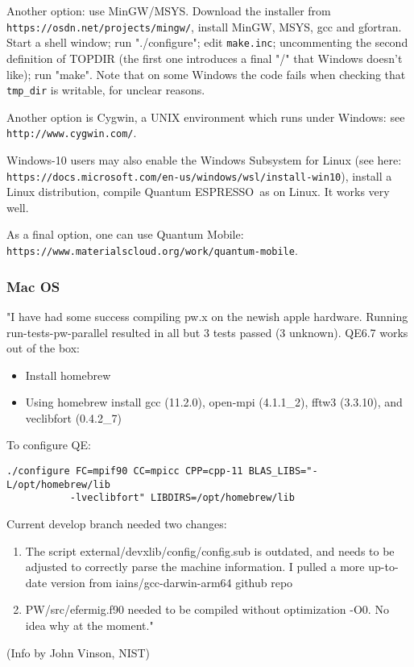 \documentclass[12pt,a4paper]{article}
\def\qe{{\sc Quantum ESPRESSO}}
\begin{document}
Another option: use MinGW/MSYS. Download the installer from
\texttt{https://osdn.net/projects/mingw/}, install MinGW, MSYS, gcc and
gfortran. Start a shell window; run "./configure"; edit \texttt{make.inc};
uncommenting the second definition of TOPDIR (the first one introduces a
final "/" that Windows doesn't like); run "make". Note that on some Windows
the code fails when checking that \texttt{tmp\_dir} is writable, for unclear
reasons.

Another option is Cygwin, a UNIX environment which runs under Windows: see\\
\texttt{http://www.cygwin.com/}.

Windows-10 users may also enable the Windows Subsystem for Linux (see here:\\
\texttt{https://docs.microsoft.com/en-us/windows/wsl/install-win10}),
install a Linux distribution, compile \qe\ as on Linux. It works very well.

As a final option, one can use Quantum Mobile:\\
\texttt{https://www.materialscloud.org/work/quantum-mobile}.

\subsubsection{Mac OS}

"I have had some success compiling pw.x on the newish apple hardware.
Running run-tests-pw-parallel resulted in all but 3 tests passed (3 unknown).
QE6.7 works out of the box:
\begin{itemize}
\item Install homebrew
\item Using homebrew install gcc (11.2.0), open-mpi (4.1.1\_2), 
fftw3 (3.3.10), and veclibfort (0.4.2\_7)
\end{itemize}
To configure QE: 
\begin{verbatim}
./configure FC=mpif90 CC=mpicc CPP=cpp-11 BLAS_LIBS="-L/opt/homebrew/lib
           -lveclibfort" LIBDIRS=/opt/homebrew/lib
\end{verbatim}
Current develop branch needed two changes:
\begin{enumerate}
\item The script external/devxlib/config/config.sub is outdated, 
and needs to be adjusted to correctly parse the machine information. 
I pulled a more up-to-date version from iains/gcc-darwin-arm64 github repo\\
\item PW/src/efermig.f90 needed to be compiled without optimization -O0. 
No idea why at the moment."
\end{enumerate}
(Info by John Vinson, NIST)
\end{document}
